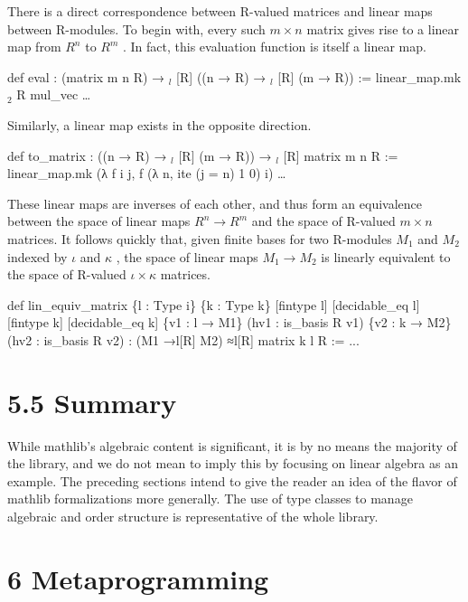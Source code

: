 \documentclass[
]{article}
\newenvironment{Shaded}{}{}
\newcommand{\NormalTok}[1]{#1}
\begin{document}
There is a direct correspondence between R-valued matrices and linear
maps between R-modules. To begin with, every such \(m \times n\) matrix
gives rise to a linear map from \(R^{n}\) to \(R^{m}\) . In fact, this
evaluation function is itself a linear map.

def eval : (matrix m n R) → \(_{l}\) {[}R{]} ((n → R) → \(_{l}\) {[}R{]}
(m → R)) := linear\_map.mk \(_{2}\) R mul\_vec \ldots{}

Similarly, a linear map exists in the opposite direction.

def to\_matrix : ((n → R) → \(_{l}\) {[}R{]} (m → R)) → \(_{l}\) {[}R{]}
matrix m n R := linear\_map.mk (λ f i j, f (λ n, ite (j = n) 1 0) i)
\ldots{}

These linear maps are inverses of each other, and thus form an
equivalence between the space of linear maps \(R^{n} \rightarrow R^{m}\)
and the space of R-valued \(m \times n\) matrices. It follows quickly
that, given finite bases for two R-modules \(M_{1}\) and \(M_{2}\)
indexed by \(\iota\) and \(\kappa\) , the space of linear maps
\(M_{1} \rightarrow M_{2}\) is linearly equivalent to the space of
R-valued \(\iota \times \kappa\) matrices.

\begin{Shaded}
\begin{Highlighting}[]
\NormalTok{def lin\_equiv\_matrix \{l : Type i\} \{k : Type k\}}
\NormalTok{    [fintype l] [decidable\_eq l]}
\NormalTok{    [fintype k] [decidable\_eq k]}
\NormalTok{    \{v1 : l → M1\} (hv1 : is\_basis R v1)}
\NormalTok{    \{v2 : k → M2\} (hv2 : is\_basis R v2) :}
\NormalTok{    (M1 →l[R] M2) ≈l[R] matrix k l R := ... }
\end{Highlighting}
\end{Shaded}

\section{5.5 Summary}\label{summary}

While mathlib's algebraic content is significant, it is by no means the
majority of the library, and we do not mean to imply this by focusing on
linear algebra as an example. The preceding sections intend to give the
reader an idea of the flavor of mathlib formalizations more generally.
The use of type classes to manage algebraic and order structure is
representative of the whole library.

\section{6 Metaprogramming}\label{metaprogramming}
\end{document}
